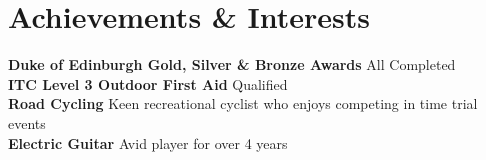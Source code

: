 \documentclass[a4paper,11pt]{article}
\begin{document}
\section{Achievements \& Interests}
  \textbf{Duke of Edinburgh Gold, Silver \& Bronze Awards}{ All Completed } \\
  \textbf{ITC Level 3 Outdoor First Aid}{ Qualified}\\
  \textbf{Road Cycling}{ Keen recreational cyclist who enjoys competing in time trial events} \\
  \textbf{Electric Guitar}{ Avid player for over 4 years} \\
  
  
  
\end{document}
